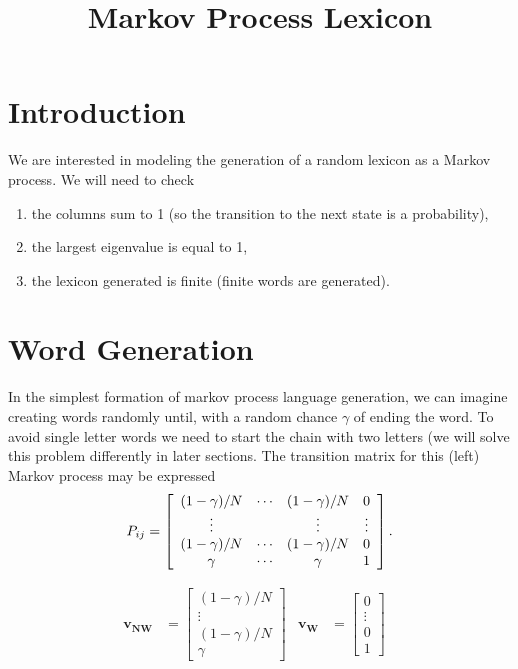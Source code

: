 \documentclass[11pt]{article}
\title{Markov Process Lexicon}
\begin{document}
\maketitle

\section{Introduction}
We are interested in modeling the generation of a random lexicon as a Markov process. We will need to check
\begin{enumerate}
\item the columns sum to 1 (so the transition to the next state is a probability),
\item the largest eigenvalue is equal to 1,
\item the lexicon generated is finite (finite words are generated).
\end{enumerate}


\section{Word Generation}

In the simplest formation of markov process language generation, we can imagine creating words randomly until, with a random chance $\gamma$ of ending the word. To avoid single letter words we need to start the chain with two letters (we will solve this problem differently in later sections. The transition matrix for this (left) Markov process may be expressed
\begin{equation}
P_{ij}=\left[\begin{array}{c c c c c c}
(1-\gamma)/N & \cdots & (1-\gamma)/N& 0\\
\vdots& & \vdots & \vdots\\
 (1-\gamma)/N & \cdots & (1-\gamma)/N & 0\\
\gamma & \cdots &\gamma & 1
\end{array}
\right].
\end{equation}

\begin{align}
\mathbf{v_{NW}}& = \left[\begin{array}{c}
(1-\gamma)/N \\ \vdots \\ (1-\gamma)/N \\ \gamma
\end{array}\right] & 
\mathbf{v_W}& = \left[\begin{array}{c}
0 \\ \vdots \\ 0 \\ 1
\end{array}\right] & 
\end{align}
\end{document}

